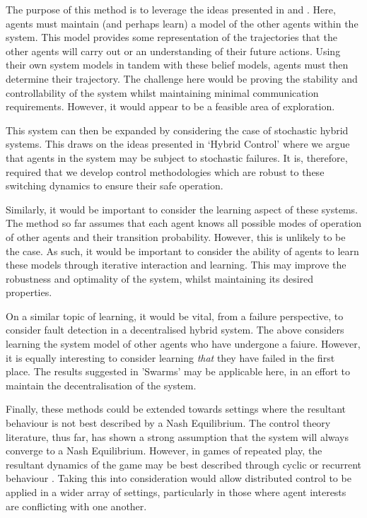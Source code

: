 \documentclass[../sample.tex]{subfiles}
\begin{document}
The purpose of this method is to leverage the ideas presented in \cite{Foerster} and
\cite{Heirung2019}. Here, agents must maintain (and perhaps learn) a model of the other agents
within the system. This model provides some representation of the trajectories that the other agents
will carry out or an understanding of their future actions. Using their own system models in tandem
with these belief models, agents must then determine their trajectory. The challenge here would be
proving the stability and controllability of the system whilst maintaining minimal communication
requirements. However, it would appear to be a feasible area of exploration. 

This system can then be expanded by considering the case of stochastic hybrid systems. This draws on
the ideas presented in ‘Hybrid Control’ where we argue that agents in the system may be subject to
stochastic failures. It is, therefore, required that we develop control methodologies which are
robust to these switching dynamics to ensure their safe operation. 

Similarly, it would be important to consider the learning aspect of these systems. The method so far
assumes that each agent knows all possible modes of operation of other agents and their transition
probability. However, this is unlikely to be the case. As such, it would be important to consider
the ability of agents to learn these models through iterative interaction and learning. This may
improve the robustness and optimality of the system, whilst maintaining its desired properties. 

On a similar topic of learning, it would be vital, from a failure perspective, to consider fault
detection in a decentralised hybrid system. The above considers learning the system model of other
agents who have undergone a faiure. However, it is equally interesting to consider learning 
\textit{that} they have failed in the first place. The results suggested in 'Swarms' may be
applicable here, in an effort to maintain the decentralisation of the system.

Finally, these methods could be extended towards settings where the resultant behaviour is not best
described by a Nash Equilibrium. The control theory literature, thus far, has shown a strong
assumption that the system will always converge to a Nash Equilibrium. However, in games of repeated
play, the resultant dynamics of the game may be best described through cyclic or recurrent behaviour
\cite{Boone2019FromTheory}. Taking this into consideration would allow distributed control to be applied in a
wider array of settings, particularly in those where agent interests are conflicting with one
another.
\end{document}
